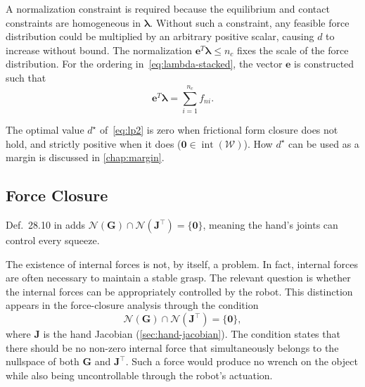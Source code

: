 A normalization constraint is required because the equilibrium and contact
constraints are homogeneous in $\boldsymbol{\lambda}$. Without such a
constraint, any feasible force distribution could be multiplied by an
arbitrary positive scalar, causing $d$ to increase without bound. The
normalization $\boldsymbol{e}^{T}\boldsymbol{\lambda} \leq n_c$ fixes the
scale of the force distribution. For the ordering in~\eqref{eq:lambda-stacked},
the vector $\boldsymbol{e}$ is constructed such that
\begin{equation}
    \boldsymbol{e}^{T}\boldsymbol{\lambda}
    =
    \sum_{i=1}^{n_c} f_{ni}.
\end{equation}

The optimal value $d^\star$ of~\eqref{eq:lp2} is zero when frictional form
closure does not hold, and strictly positive when it does
($\mathbf{0} \in \operatorname{int}(\mathcal{W})$). How $d^\star$ can be used
as a margin is discussed in \cref{chap:margin}.

\subsection{Force Closure}
\label{sec:force-closure-def}

Def.~28.10 in \cite{prattichizzo2008grasping} adds
$\mathcal{N}(\boldsymbol{G}) \cap \mathcal{N}(\boldsymbol{J}^\top) = \{\mathbf{0}\}$,
meaning the hand's joints can control every squeeze.

The existence of internal forces is not, by itself, a problem. In fact,
internal forces are often necessary to maintain a stable grasp. The relevant
question is whether the internal forces can be appropriately controlled by
the robot. This distinction appears in the force-closure analysis through
the condition
\begin{equation}
    \mathcal{N}(\boldsymbol{G})\cap\mathcal{N}(\boldsymbol{J}^\top)=\{\mathbf{0}\},
    \label{eq:fc-nullspace-condition}
\end{equation}
where $\boldsymbol{J}$ is the hand Jacobian (\cref{sec:hand-jacobian}). The
condition states that there should be no non-zero internal force that
simultaneously belongs to the nullspace of both $\boldsymbol{G}$ and
$\boldsymbol{J}^\top$. Such a force would produce no wrench on the object
while also being uncontrollable through the robot's actuation.

